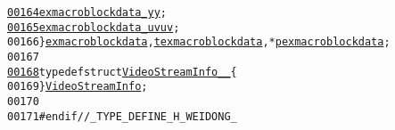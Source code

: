 \begin{footnotesize}
\begin{alltt}
\hypertarget{_types_8h_source_l00164}{}\hyperlink{structexmacroblockdata_a1a0e62951bdb79d51731b73601701cba}{00164}         \hyperlink{_types_8h_a0f66eed76a4d7c1c98b92eb97caf0186}{exmacroblockdata_y}      \hyperlink{structexmacroblockdata_a1a0e62951bdb79d51731b73601701cba}{y};
\hypertarget{_types_8h_source_l00165}{}\hyperlink{structexmacroblockdata_aeb6134d7ce9eb3883acb9858d303f475}{00165}         \hyperlink{_types_8h_a76c3a1d0417486239b5034c010e36ece}{exmacroblockdata_uv}     \hyperlink{structexmacroblockdata_aeb6134d7ce9eb3883acb9858d303f475}{uv};
00166 \} \hyperlink{structexmacroblockdata}{exmacroblockdata}, \hyperlink{structexmacroblockdata}{texmacroblockdata}, *\hyperlink{structexmacroblockdata}{pexmacroblockdata};
00167 
\hypertarget{_types_8h_source_l00168}{}\hyperlink{struct_video_stream_info____}{00168} \textcolor{keyword}{typedef} \textcolor{keyword}{struct }\hyperlink{struct_video_stream_info____}{VideoStreamInfo__} \{
00169 \} \hyperlink{struct_video_stream_info____}{VideoStreamInfo};
00170 
00171 \textcolor{preprocessor}{#endif //\_TYPE\_DEFINE\_H\_WEIDONG\_}
\end{alltt}\end{footnotesize}
